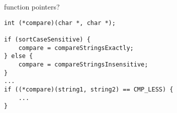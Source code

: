 

\begin{frame}[fragile,label=funcPtrQ]{function pointers?}
\lstset{language=C,style=small}
\begin{lstlisting}
int (*compare)(char *, char *);

if (sortCaseSensitive) {
    compare = compareStringsExactly;
} else {
    compare = compareStringsInsensitive;
}
...
if ((*compare)(string1, string2) == CMP_LESS) {
    ...
}
\end{lstlisting}
\end{frame}
